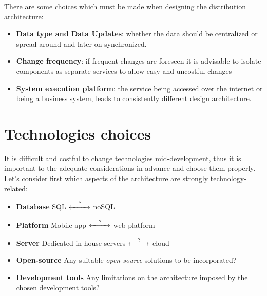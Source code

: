 There are some choices which must be made when designing the distribution architecture:
\begin{itemize}
    \item \textbf{Data type and Data Updates}: whether the data should be centralized or spread around and later on synchronized.
    \item \textbf{Change frequency}: if frequent changes are foreseen it is advisable to isolate components as separate services to allow easy and uncostful changes
    \item \textbf{System execution platform}: the service being accessed over the internet or being a business system, leads to consistently different design architecture.
\end{itemize}

\section{Technologies choices}
It is difficult and costful to change technologies mid-development,
thus it is important to the adequate considerations in advance and choose them properly.
Let's consider first which aspects of the architecture are strongly technology-related:
\begin{itemize}
    \item \textbf{Database} SQL $\xleftrightarrow{\hspace*{1em}?\hspace*{1em}}$ noSQL
    \item \textbf{Platform} Mobile app $\xleftrightarrow{\hspace*{1em}?\hspace*{1em}}$ web platform
    \item \textbf{Server} Dedicated in-house servers $\xleftrightarrow{\hspace*{1em}?\hspace*{1em}}$ cloud
    \item \textbf{Open-source} Any suitable \textit{open-source} solutions to be incorporated?
    \item \textbf{Development tools} Any limitations on the architecture imposed by the chosen development tools?
\end{itemize}